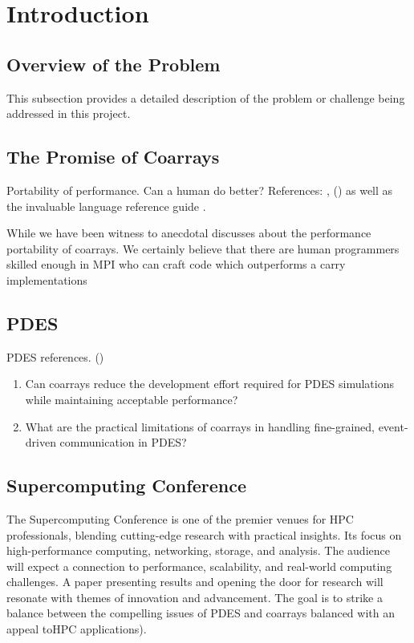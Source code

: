 % 

\section{Introduction}  %

\subsection{Overview of the Problem}
This subsection provides a detailed description of the problem or challenge being addressed in this project.

\subsection{The Promise of Coarrays}
Portability	of performance. Can a human do better? References: \cite{numrich2018parallel, ray2019fortran}, (\cite{markus2012modern, clerman2011modern, Hanson2013}) as well as the invaluable language reference guide \cite{metcalf2024modern}.	

While we have been witness to anecdotal discusses about the performance portability of coarrays. We certainly believe that there are human programmers skilled enough in MPI who can craft code which outperforms a carry implementations

\subsection{PDES}
PDES references. (\cite{fujimoto1990parallel, fujimoto1993parallel, fujimoto2017parallel})
\begin{enumerate}
	\item Can coarrays reduce the development effort required for PDES simulations while maintaining acceptable performance?
	\item What are the practical limitations of coarrays in handling fine-grained, event-driven communication in PDES?
\end{enumerate}


\subsection{Supercomputing Conference}
The Supercomputing Conference is one of the premier venues for HPC professionals, blending cutting-edge research with practical insights. Its focus on high-performance computing, networking, storage, and analysis. The audience will expect a connection to performance, scalability, and real-world computing challenges. A paper presenting results and opening the door for research will resonate with themes of innovation and advancement. The goal is to strike a balance between the compelling issues of PDES and  coarrays balanced with an appeal toHPC applications).

